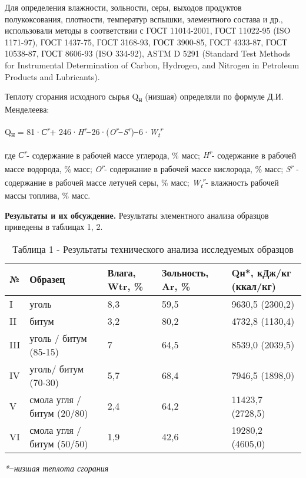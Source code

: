 \begin{multicols}{2}
Для определения влажности, зольности, серы, выходов продуктов
полукоксования, плотности, температур вспышки, элементного состава и
др., использовали методы в соответствии с ГОСТ 11014-2001, ГОСТ 11022-95
(ISO 1171-97), ГОСТ 1437-75, ГОСТ 3168-93, ГОСТ 3900-85, ГОСТ 4333-87,
ГОСТ 10538-87, ГОСТ 8606-93 (ISO 334-92), ASTM D 5291 (Standard Test
Methods for Instrumental Determination of Carbon, Hydrogen, and Nitrogen
in Petroleum Products and Lubricants).

Теплоту сгорания исходного сырья Q\textsubscript{н} (низшая) определяли
по формуле Д.И. Менделеева:

Q\textsubscript{н} = 81·\emph{С\textsuperscript{r}}+
246·\emph{H\textsuperscript{r}} ̶ 26·(\emph{O\textsuperscript{r}} ̶
\emph{S\textsuperscript{r}}) ̶
6·\emph{W\textsubscript{t}\textsuperscript{r}}

где \emph{С\textsuperscript{r}}- содержание в рабочей массе углерода, \%
масс; \emph{H\textsuperscript{r}}- содержание в рабочей массе водорода,
\% масс; \emph{O\textsuperscript{r}}- содержание в рабочей массе
кислорода, \% масс; \emph{S\textsuperscript{r}} - содержание в рабочей
массе летучей серы, \% масс;
\emph{W\textsubscript{t}\textsuperscript{r}}- влажность рабочей массы
топлива, \% масс.

{\bfseries Результаты и их обсуждение.} Результаты элементного анализа
образцов приведены в таблицах 1, 2.
\end{multicols}

\begin{table}[H]
\caption*{Таблица 1 - Результаты технического анализа исследуемых образцов}
\centering
\begin{tabular}{|l|l|l|l|l|}
\hline
№ & Образец & Влага, Wtr, \% & Зольность, Ar, \% & Qн*, кДж/кг (ккал/кг) \\ \hline
I & уголь & 8,3 & 59,5 & 9630,5 (2300,2) \\ \hline
II & битум & 3,2 & 80,2 & 4732,8 (1130,4) \\ \hline
III & уголь / битум (85-15) & 7 & 64,5 & 8539,0 (2039,5) \\ \hline
IV & уголь/ битум (70-30) & 5,7 & 68,4 & 7946,5 (1898,0) \\ \hline
V & смола угля / битум (20/80) & 2,4 & 64,2 & 11423,7 (2728,5) \\ \hline
VI & смола угля / битум (50/50) & 1,9 & 42,6 & 19280,2 (4605,0) \\ \hline
\end{tabular}
\end{table}
\emph{* ̶ низшая теплота сгорания}

